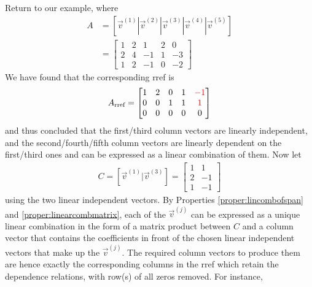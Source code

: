 Return to our example, where
\begin{align*}
A &= [\vec{v}^{(1)}|\vec{v}^{(2)}|\vec{v}^{(3)}|\vec{v}^{(4)}|\vec{v}^{(5)}] \\
&= 
\begin{bmatrix}
1 & 2 & 1 & 2 & 0 \\
2 & 4 & -1 & 1 & -3\\
1 & 2 & -1 & 0 & -2
\end{bmatrix}
\end{align*}
We have found that the corresponding rref is
\begin{align*}
A_{\text{rref}} =
\begin{bmatrix}
1 & 2 & 0 & 1 & \textcolor{red}{-1} \\
0 & 0 & 1 & 1 & \textcolor{red}{1} \\
0 & 0 & 0 & 0 & 0
\end{bmatrix}
\end{align*}
and thus concluded that the first/third column vectors are linearly independent, and the second/fourth/fifth column vectors are linearly dependent on the first/third ones and can be expressed as a linear combination of them. Now let
\begin{align*}
C = [\vec{v}^{(1)}|\vec{v}^{(3)}] = \begin{bmatrix}
1 & 1 \\
2 & -1 \\
1 & -1
\end{bmatrix}
\end{align*}
using the two linear independent vectors. By Properties \ref{proper:lincombofspan} and \ref{proper:linearcombmatrix}, each of the $\vec{v}^{(j)}$ can be expressed as a unique linear combination in the form of a matrix product between $C$ and a column vector that contains the coefficients in front of the chosen linear independent vectors that make up the $\vec{v}^{(j)}$. The required column vectors to produce them are hence exactly the corresponding columns in the rref which retain the dependence relations, with row(s) of all zeros removed. For instance,
